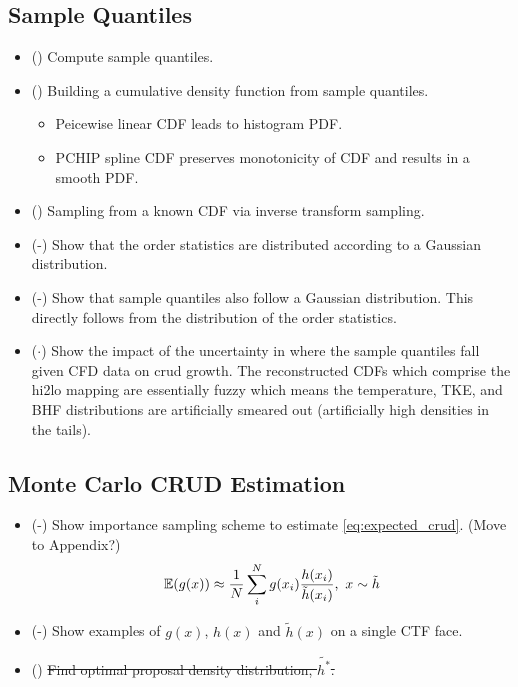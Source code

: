 \subsection{Sample Quantiles}

\begin{itemize}
        \item (\checkmark) Compute sample quantiles.
        \item (\checkmark) Building a cumulative density function from sample quantiles.
        \begin{itemize}
           \item Peicewise linear CDF leads to histogram PDF.
           \item PCHIP spline CDF preserves monotonicity of CDF and results in a smooth PDF. \cite{Fritsch80}
        \end{itemize}
        \item (\checkmark) Sampling from a known CDF via inverse transform sampling.
        \item (\checkmark-) Show that the order statistics are distributed according to a Gaussian distribution.
        \item (\checkmark-) Show that sample quantiles also follow a Gaussian distribution.  This directly follows from the distribution of the order statistics.
        \item ($\cdot$) Show the impact of the uncertainty in where the sample quantiles fall given CFD data on crud growth.  The reconstructed CDFs which comprise the hi2lo mapping are essentially fuzzy which means the temperature, TKE, and BHF distributions are artificially smeared out (artificially high densities in the tails).
\end{itemize}

\subsection{Monte Carlo CRUD Estimation}

\begin{itemize}
        \item (\checkmark-) Show importance sampling scheme to estimate \ref{eq:expected_crud}.  (Move to Appendix?)
        \begin{equation}
        \operatorname*{\mathbb{E}}(g(x)) \approx \frac{1}{N} \sum_i^N g(x_i) \frac{h(x_i)}{\tilde h(x_i)}, \ x \sim \tilde{h}
        \end{equation}
        \item (\checkmark-) Show examples of $g(x)$, $h(x)$ and $\tilde h(x)$ on a single CTF face.
        \item (\xmark) \sout{Find optimal proposal density distribution, $\tilde{h^*}$.}
\end{itemize}


